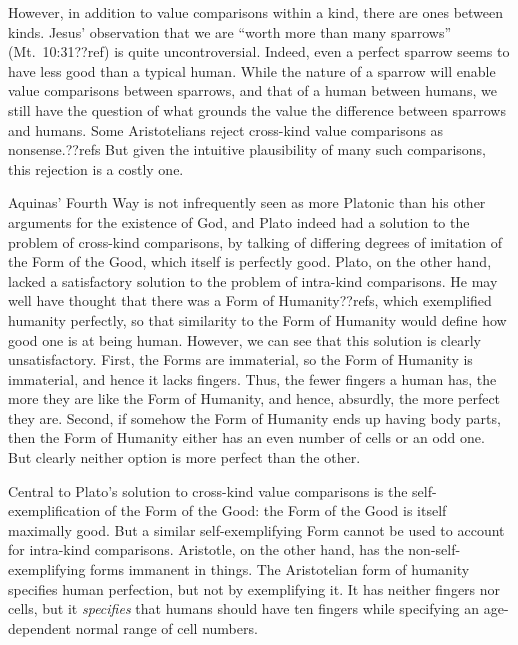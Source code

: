 However, in addition to value comparisons within a kind, there are ones between kinds. Jesus' observation
that we are ``worth more than many sparrows'' (Mt.\ 10:31??ref) is quite uncontroversial.
Indeed, even a perfect sparrow seems to have less good than a typical human. While the nature of a sparrow
will enable value comparisons between sparrows, and that of a human between humans, we still have the question
of what grounds the value the difference between sparrows and humans. Some Aristotelians reject cross-kind 
value comparisons as nonsense.??refs But given the intuitive plausibility of many such comparisons, this rejection
is a costly one.

Aquinas' Fourth Way is not infrequently seen as more Platonic than his other arguments for the existence of
God, and Plato indeed had a solution to the problem of cross-kind comparisons, by talking of differing degrees
of imitation of the Form of the Good, which itself is perfectly good. Plato, on the other hand, lacked a 
satisfactory solution to the problem of intra-kind comparisons. He may well have thought that there 
was a Form of Humanity??refs, which exemplified humanity perfectly, so that similarity to the Form of 
Humanity would define how good one is at being human. However,
we can see that this solution is clearly unsatisfactory. First, the Forms are immaterial, so the Form of Humanity is 
immaterial, and hence it lacks fingers. Thus, the fewer fingers a human has, the more they are like the Form of
Humanity, and hence, absurdly, the more perfect they are. Second, if somehow the Form of Humanity ends up having 
body parts, then the Form of Humanity either has an even number of cells or an odd one. But clearly neither option
is more perfect than the other. 

Central to Plato's solution to cross-kind value comparisons is the self-exemplification of the Form of the Good:
the Form of the Good is itself maximally good. But a similar self-exemplifying Form cannot be used to account for
intra-kind comparisons. Aristotle, on the other hand, has the non-self-exemplifying forms immanent in things. 
The Aristotelian form of humanity specifies human perfection, but not by exemplifying it. It has neither
fingers nor cells, but it \textit{specifies} that humans should have ten fingers while specifying an age-dependent
normal range of cell numbers.

